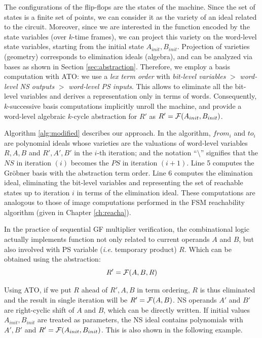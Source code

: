 The configurations of the flip-flops are the states of the
machine. Since the set of states is a finite set of points, we
can consider it as the variety of an ideal related to the circuit.
Moreover, since we are interested in
the function encoded by the state variables (over $k$-time
frames), we can project this variety on the word-level state
variables, starting from the initial state $A_{init}, B_{init}$.
Projection of varieties (geometry) corresponds to elimination ideals
(algebra), and can be analyzed via \Grobner bases as shown in Section \ref{sec:abstraction}. Therefore, we
employ a \Grobner basis computation with ATO: we use a {\it lex term
  order} with {\it bit-level variables} 
$>$ {\it word-level NS outputs} $>$ {\it word-level PS inputs}. This
allows to eliminate all the bit-level variables 
and derives a representation only in terms of words. 
Consequently, $k$-successive \Grobner basis computations implicitly
unroll the machine, and provide a word-level algebraic $k$-cycle
abstraction for $R'$ as $R' = {\mathcal{F}}(A_{init}, B_{init})$. 

Algorithm
\ref{alg:modified} describes our approach.  In the algorithm, $from_i$
and $to_i$ are polynomial ideals whose varieties are the valuations of
word-level variables $R, A, B$ and $R',A',B'$ in the $i$-th iteration;
and the notation ``$\setminus$'' signifies that the $NS$ in iteration
$(i)$ becomes the $PS$ in iteration $(i+1)$. Line 5 computes the Gr\"obner 
basis with the abstraction term order.  Line 6 computes the elimination 
ideal, eliminating the bit-level variables and representing the set of 
reachable states up to iteration $i$ in terms of the elimination ideal. 
These computations are analogous to those of image computations performed in 
the FSM reachability algorithm (given in Chapter \ref{ch:reacha}).

In the practice of sequential GF multiplier verification, the combinational 
logic actually implements function not only related to current operands $A$ and $B$,
but also involved with PS variable ({\it i.e.} temporary product) $R$. Which can be 
obtained using the abstraction:
$$R' = {\mathcal{F}}(A,B,R)$$

Using ATO, if we put $R$ ahead of $R',A,B$ in term ordering, $R$ is thus eliminated
and the result in single iteration will be $R' = {\mathcal{F}}(A,B)$. NS operands 
$A'$ and $B'$ are right-cyclic shift of $A$ and $B$, which can be directly written.
If initial values $A_{init}, B_{init}$ are treated as parameters, the NS ideal 
contains polynomials with $A', B'$ and $R' = {\mathcal{F}}(A_{init},B_{init})$. This 
is also shown in the following example.


